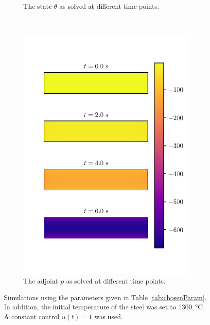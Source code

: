 \begin{figure}
{\begin{subfigure}[t]{3.5in}
        \caption{The state $\theta$ as solved at different time points.}
        \label{fig:state_simulations_a}
    \end{subfigure}
    ~
    \begin{subfigure}[t]{3.5in}
        \includegraphics{figures/uniform_u_adjoint.pdf}
        \caption{The adjoint $p$ as solved at different time points.}
        \label{fig:state_simulations_b}
    \end{subfigure}
    }
    \caption{Simulations using the parameters given in Table \ref{tab:chosenParam}. In addition, the initial temperature of the steel was set to \SI{1300}{\celsius}. A constant control $u(t) = 1$ was used.}
    \label{fig:state_simulations}
\end{figure}
